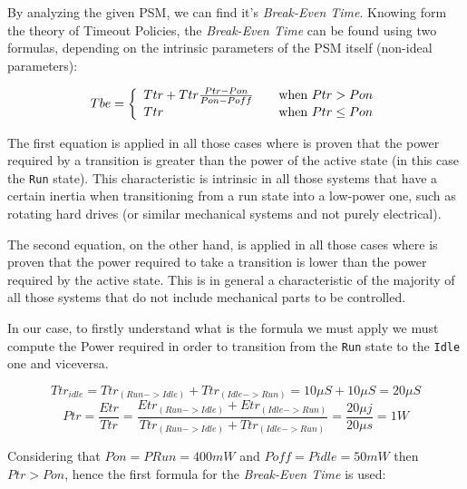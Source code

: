 \documentclass[a4paper]{article}
\begin{document}
            By analyzing the given PSM, we can find it's \emph{Break-Even Time}. Knowing form the theory of Timeout Policies, the \emph{Break-Even Time} can be found using two formulas, depending on the intrinsic parameters of the PSM itself (non-ideal parameters):

            \begin{equation}
                Tbe = \left\{
                \begin{array}{l l}
                Ttr + Ttr \frac{Ptr - Pon}{Pon - Poff} & \quad \text{when $Ptr > Pon$}\\
                Ttr & \quad \text{when $Ptr \le Pon$}\\
                \end{array}
                \right.
            \end{equation}

            The first equation is applied in all those cases where is proven that the power required by a transition is greater than the power of the active state (in this case the \texttt{Run} state). This characteristic is intrinsic in all those systems that have a certain inertia when transitioning from a run state into a low-power one, such as rotating hard drives (or similar mechanical systems and not purely electrical).

            The second equation, on the other hand, is applied in all those cases where is proven that the power required to take a transition is lower than the power required by the active state. This is in general a characteristic of the majority of all those systems that do not include mechanical parts to be controlled.

            In our case, to firstly understand what is the formula we must apply we must compute the Power required in order to transition from the \texttt{Run} state to the \texttt{Idle} one and viceversa.

            \begin{equation}
                Ttr_{idle} = Ttr_{(Run->Idle)} + Ttr_{(Idle->Run)} = 10 \mu S + 10 \mu S = 20 \mu S
            \end{equation}
            \begin{equation}
                Ptr = \frac{Etr}{Ttr} = \frac{Etr_{(Run->Idle)} + Etr_{(Idle->Run)}}{Ttr_{(Run->Idle)} + Ttr_{(Idle->Run)}} = \frac{20 \mu j}{20 \mu s} = 1W
            \end{equation}

            Considering that $Pon = PRun = 400mW$ and $Poff = Pidle = 50 mW$ then $Ptr > Pon$, hence the first formula for the \emph{Break-Even Time} is used:
\end{document}
